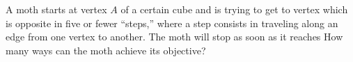 A moth starts at vertex $A$ of a certain cube and is trying to get to vertex  which is opposite  in five or fewer “steps,” where a step consists in traveling along an edge from one vertex to another. The moth will stop as soon as it reaches  How many ways can the moth achieve its objective?